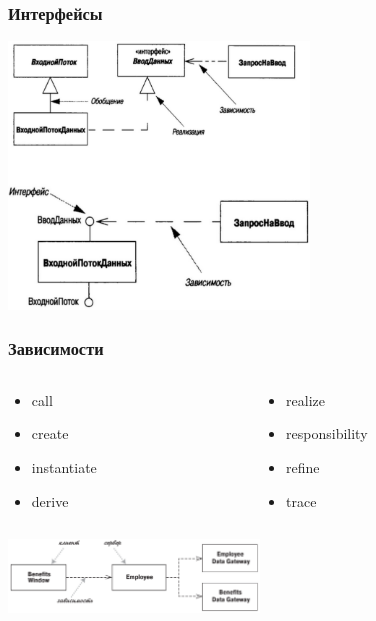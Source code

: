 \documentclass{../../slides-style}
\begin{document}
    \begin{frame}
        \frametitle{Интерфейсы}
        \begin{center}
            \includegraphics[width=0.6\textwidth]{interfaces.png}
        \end{center}
    \end{frame}

    \begin{frame}
        \frametitle{Зависимости}
        \begin{columns}
            \begin{column}{0.5\textwidth}
                \begin{itemize}
                    \item call
                    \item create
                    \item instantiate
                    \item derive 
                \end{itemize}
            \end{column}
            \begin{column}{0.5\textwidth}
                \begin{itemize}
                    \item realize
                    \item responsibility
                    \item refine 
                    \item trace
                \end{itemize}
            \end{column}
        \end{columns}
        \vspace{7mm}
        \begin{center}
            \includegraphics[width=0.5\textwidth]{dependencies.png}
        \end{center}
    \end{frame}
\end{document}
